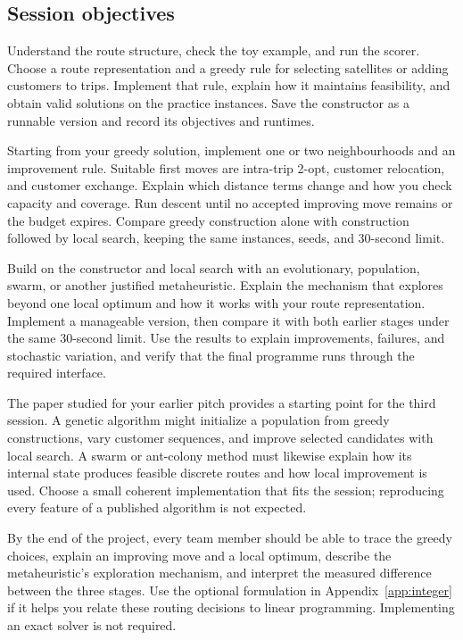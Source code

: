 \documentclass[11pt,a4paper]{article}
\begin{document}
\subsection{Session objectives}
\begin{description}[leftmargin=0pt,labelwidth=0pt,labelsep=0pt,style=nextline]
\item[Session 1: implement a greedy constructor.] Understand the route structure, check the toy example, and run the scorer. Choose a route representation and a greedy rule for selecting satellites or adding customers to trips. Implement that rule, explain how it maintains feasibility, and obtain valid solutions on the practice instances. Save the constructor as a runnable version and record its objectives and runtimes.
\item[Session 2: implement local search.] Starting from your greedy solution, implement one or two neighbourhoods and an improvement rule. Suitable first moves are intra-trip 2-opt, customer relocation, and customer exchange. Explain which distance terms change and how you check capacity and coverage. Run descent until no accepted improving move remains or the budget expires. Compare greedy construction alone with construction followed by local search, keeping the same instances, seeds, and 30-second limit.
\item[Session 3: implement a more complex metaheuristic.] Build on the constructor and local search with an evolutionary, population, swarm, or another justified metaheuristic. Explain the mechanism that explores beyond one local optimum and how it works with your route representation. Implement a manageable version, then compare it with both earlier stages under the same 30-second limit. Use the results to explain improvements, failures, and stochastic variation, and verify that the final programme runs through the required interface.
\end{description}
The paper studied for your earlier pitch provides a starting point for the third session. A genetic algorithm might initialize a population from greedy constructions, vary customer sequences, and improve selected candidates with local search. A swarm or ant-colony method must likewise explain how its internal state produces feasible discrete routes and how local improvement is used. Choose a small coherent implementation that fits the session; reproducing every feature of a published algorithm is not expected.

By the end of the project, every team member should be able to trace the greedy choices, explain an improving move and a local optimum, describe the metaheuristic's exploration mechanism, and interpret the measured difference between the three stages. Use the optional formulation in Appendix~\ref{app:integer} if it helps you relate these routing decisions to linear programming. Implementing an exact solver is not required.
\end{document}
